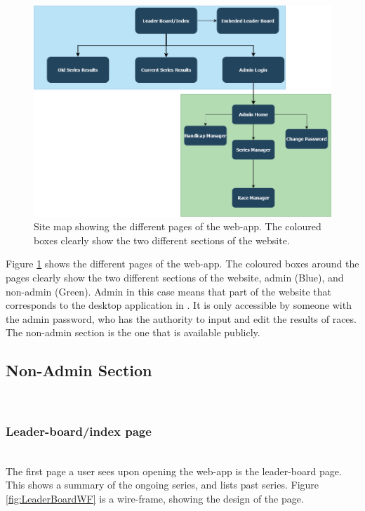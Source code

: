 \documentclass{l4proj}
\begin{document}
\begin{figure}[h!]
    \centering
    \includegraphics[width=1\linewidth]{images/SiteMap.png} 

    \caption{Site map showing the different pages of the web-app. The coloured boxes clearly show the two different sections of the website.
    }

    \label{fig:Site Map}
\end{figure}

Figure \ref{fig:Site Map} shows the different pages of the web-app. The coloured boxes around the pages clearly show the two different sections of the website, admin (Blue), and non-admin (Green). Admin in this case means that part of the website that corresponds to the desktop application in \citet{sailwave}. It is only accessible by someone with the admin password, who has the authority to input and edit the results of races. The non-admin section is the one that is available publicly.

\subsection{Non-Admin Section}

\hfill\\
\subsubsection{Leader-board/index page}
\hfill\\
The first page a user sees upon opening the web-app is the leader-board page. This shows a summary of the ongoing series, and lists past series. Figure \ref{fig:LeaderBoardWF} is a wire-frame, showing the design of the page.
\end{document}
